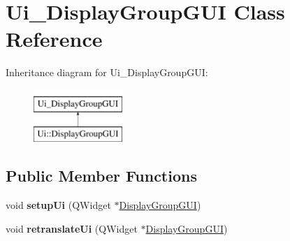 \hypertarget{classUi__DisplayGroupGUI}{}\section{Ui\+\_\+\+Display\+Group\+G\+UI Class Reference}
\label{classUi__DisplayGroupGUI}
Inheritance diagram for Ui\+\_\+\+Display\+Group\+G\+UI\+:\begin{figure}[H]
\begin{center}
\leavevmode
\includegraphics[height=2.000000cm]{classUi__DisplayGroupGUI}
\end{center}
\end{figure}
\subsection*{Public Member Functions}
\begin{DoxyCompactItemize}
\item 
void {\bfseries setup\+Ui} (Q\+Widget $\ast$\hyperlink{classDisplayGroupGUI}{Display\+Group\+G\+UI})\hypertarget{classUi__DisplayGroupGUI_ad48e62533504bc100d003cdaf2a681f8}{}\label{classUi__DisplayGroupGUI_ad48e62533504bc100d003cdaf2a681f8}

\item 
void {\bfseries retranslate\+Ui} (Q\+Widget $\ast$\hyperlink{classDisplayGroupGUI}{Display\+Group\+G\+UI})\hypertarget{classUi__DisplayGroupGUI_a7f3eef8410864c91eb51ba73c0ee96a9}{}\label{classUi__DisplayGroupGUI_a7f3eef8410864c91eb51ba73c0ee96a9}

\end{DoxyCompactItemize}

